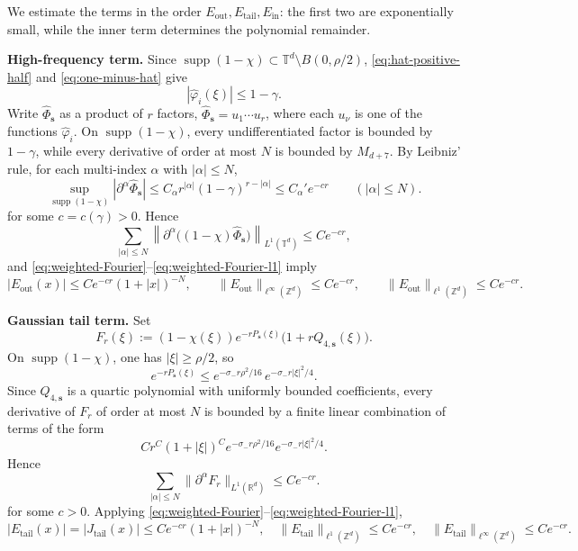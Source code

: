 \documentclass[letterpaper,11pt,reqno]{amsart}
\theoremstyle{definition}
\DeclareMathOperator\supp{supp}
\newcommand{\vs}{\mathbf{s}}\newcommand{\vt}{\mathbf{t}}\newcommand{\vu}{\mathbf{u}}
\begin{document}
We estimate the terms in the order \(E_{\mathrm{out}},E_{\mathrm{tail}},E_{\mathrm{in}}\): the
first two are exponentially small, while the inner term determines the polynomial remainder.

\smallskip
\noindent\textbf{High-frequency term.}
Since \(\supp(1-\chi)\subset\mathbb T^d\setminus B(0,\rho/2)\),
\eqref{eq:hat-positive-half} and \eqref{eq:one-minus-hat} give
\[
|\widehat\varphi_i(\xi)|\le1-\gamma.
\]
Write \(\widehat\Phi_{\mathbf s}\) as a product of \(r\) factors, $\widehat\Phi_{\mathbf s}=u_1\cdots u_r$, 
where each \(u_\nu\) is one of the functions \(\widehat\varphi_i\). On \(\operatorname{supp}(1-\chi)\), every undifferentiated factor is bounded by \(1-\gamma\), while every derivative of order at most \(N\) is bounded by \(M_{d+7}\). By Leibniz' rule, for each multi-index \(\alpha\) with \(|\alpha|\le N\),
\[
\sup_{\supp(1-\chi)}|\partial^\alpha \widehat\Phi_{\vs}|
\le
C_\alpha r^{|\alpha|}(1-\gamma)^{r-|\alpha|}
\le
C_\alpha' e^{-cr}
\qquad (|\alpha|\le N).
\]
for some $c=c(\gamma)>0$. Hence
\[
\sum_{|\alpha|\le N}\left\|\partial^\alpha\bigl((1-\chi)\widehat\Phi_{\mathbf s}\bigr)\right\|_{L^1(\mathbb T^d)}
\le
C e^{-cr},
\]
and \eqref{eq:weighted-Fourier}--\eqref{eq:weighted-Fourier-l1} imply
\begin{equation}\label{eq:Eout-bounds-final}
|E_{\mathrm{out}}(x)|\le Ce^{-cr}(1+|x|)^{-N},\qquad
\|E_{\mathrm{out}}\|_{\ell^\infty(\mathbb Z^d)}\le C e^{-c r},
\qquad
\|E_{\mathrm{out}}\|_{\ell^1(\mathbb Z^d)}\le C e^{-c r}.
\end{equation}

\smallskip
\noindent\textbf{Gaussian tail term.}
Set
\[
F_r(\xi):=(1-\chi(\xi))e^{-rP_{\vs}(\xi)}\bigl(1+rQ_{4,\vs}(\xi)\bigr).
\]
On \(\supp(1-\chi)\), one has \(|\xi|\ge\rho/2\), so
\[
e^{-rP_{\vs}(\xi)}
\le
e^{-\sigma_-r\rho^2/16}\,e^{-\sigma_-r|\xi|^2/4}.
\]
Since \(Q_{4,\vs}\) is a quartic polynomial with uniformly bounded coefficients, every
derivative of \(F_r\) of order at most \(N\) is bounded by a finite linear combination of
terms of the form
\[
Cr^C(1+|\xi|)^C e^{-\sigma_-r\rho^2/16}e^{-\sigma_-r|\xi|^2/4}.
\]
Hence
\[
\sum_{|\alpha|\le N}\|\partial^\alpha F_r\|_{L^1(\mathbb R^d)}\le Ce^{-cr}.
\]
for some \(c>0\).
Applying \eqref{eq:weighted-Fourier}--\eqref{eq:weighted-Fourier-l1},
\begin{equation}\label{eq:Etail-bounds-final}
|E_{\mathrm{tail}}(x)|=|J_{\mathrm{tail}}(x)|\le Ce^{-cr}(1+|x|)^{-N},
\quad
\|E_{\mathrm{tail}}\|_{\ell^1(\mathbb Z^d)}\le Ce^{-cr},
\quad
\|E_{\mathrm{tail}}\|_{\ell^\infty(\mathbb Z^d)}\le Ce^{-cr}.
\end{equation}
\end{document}
